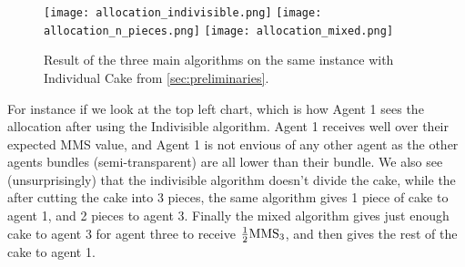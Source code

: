 \begin{figure}
    \centering
    \texttt{[image: allocation\_indivisible.png]}
    \texttt{[image: allocation\_n\_pieces.png]}
    \texttt{[image: allocation\_mixed.png]}
    \caption{Result of the three main algorithms on the same instance with Individual Cake from \autoref{sec:preliminaries}.}
    \label{fig:allocations}
\end{figure}

For instance if we look at the top left chart, which is how Agent 1 sees the allocation after using the Indivisible algorithm. Agent 1 receives well over their expected MMS value, and Agent 1 is not envious of any other agent as the other agents bundles (semi-transparent) are all lower than their bundle. We also see (unsurprisingly) that the indivisible algorithm doesn't divide the cake, while the after cutting the cake into 3 pieces, the same algorithm gives 1 piece of cake to agent 1, and 2 pieces to agent 3. Finally the mixed algorithm gives just enough cake to agent 3 for agent three to receive $\frac{1}{2}\text{MMS}_3$, and then gives the rest of the cake to agent 1.